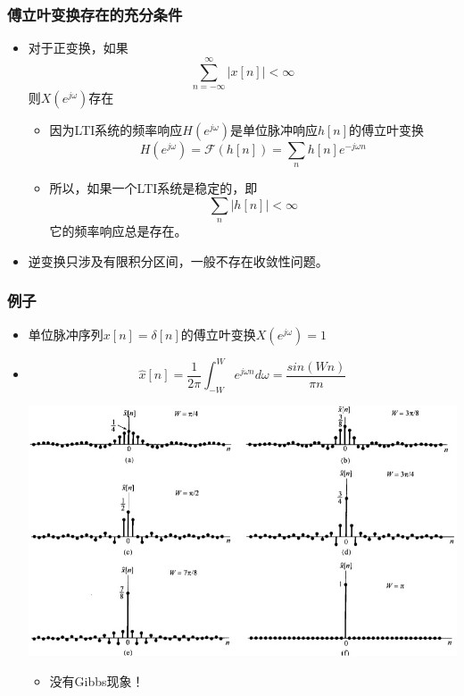 \documentclass[CJKutf8,dvipsnames,table]{beamer}
\begin{document}
\begin{CJK*}{UTF8}{song}
\begin{frame}
  \end{frame}  
  
  \begin{frame}
    \frametitle{傅立叶变换存在的充分条件}
    \begin{itemize}
    \item 对于正变换，如果
    \[
    	 \sum_{n=-\infty}^{\infty}|x[n]| < \infty
    \]
    则$X(e^{j\omega})$存在
    	\begin{itemize}
		\item 因为LTI系统的频率响应$H(e^{j\omega})$是单位脉冲响应$h[n]$的傅立叶变换
		\[
			H(e^{j\omega})=\mathscr{F}(h[n])=\sum_n h[n]e^{-j\omega n}
		\]   
		\item 所以，如果一个LTI系统是稳定的，即
		\[
			\sum_n|h[n]| < \infty
		\]
		它的频率响应总是存在。		
		\end{itemize}
    \item 逆变换只涉及有限积分区间，一般不存在收敛性问题。
    
 
    \end{itemize}

  \end{frame} 
        
  \begin{frame}
    \frametitle{例子}
    \begin{itemize}
    \item 单位脉冲序列$x[n]=\delta[n]$的傅立叶变换$X(e^{j\omega})=1$
	\item 
	\[
	\hat{x}[n] = \frac{1}{2\pi}\int_{-W}^{W} e^{j\omega n}d\omega = \frac{sin(Wn)}{\pi n}
	\]    
    	\begin{center}
    	\includegraphics[scale=.3]{ss-c-f5-7}
    	\end{center}   
		\begin{itemize}
		\item 没有Gibbs现象！
		\end{itemize}
    \end{itemize}


\end{frame}
\end{CJK*}
\end{document}
